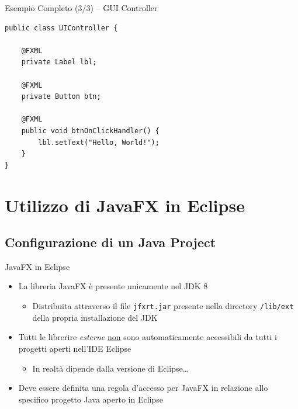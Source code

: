 \documentclass[presentation]{beamer}
\begin{document}
\begin{frame}[fragile]{Esempio Completo (3/3) -- GUI Controller}
\begin{lstlisting}
public class UIController {

	@FXML
	private Label lbl;
	
	@FXML
	private Button btn;
	
	@FXML
	public void btnOnClickHandler() {
		lbl.setText("Hello, World!");
	}
}
\end{lstlisting}
\end{frame}

\section{Utilizzo di JavaFX in Eclipse}

\subsection{Configurazione di un Java Project}

\begin{frame}{JavaFX in Eclipse}
\begin{itemize}\itemsep20pt
\item La libreria JavaFX è presente unicamente nel JDK 8
\begin{itemize}
\item Distribuita attraverso il file \texttt{jfxrt.jar} presente nella directory \texttt{/lib/ext} della propria installazione del JDK
\end{itemize}
\item Tutti le librerire \emph{esterne} \underline{non} sono automaticamente accessibili da tutti i progetti aperti nell'IDE Eclipse
\begin{itemize}
\item In realtà dipende dalla versione di Eclipse\dots
\end{itemize}
\item Deve essere definita una regola d'accesso per JavaFX in relazione allo specifico progetto Java aperto in Eclipse
\end{itemize}
\end{frame}
\end{document}
